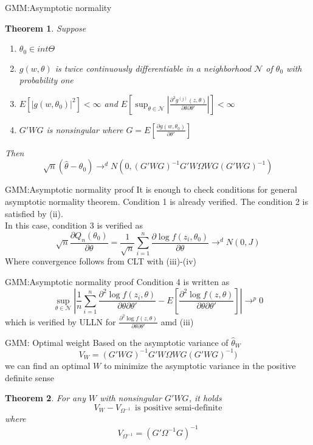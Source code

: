 \documentclass{beamer}
\newtheorem{thm}{Theorem}[subsection]
\begin{document}
\begin{frame}{GMM:Asymptotic normality}
	\begin{thm}
		Suppose 
		\begin{enumerate}
				\item $\theta_0 \in int \Theta$
				\item $g(w, \theta)$ is twice continuously differentiable in a neighborhood $\mathcal{N}$ of $\theta_0$ with probability one
				\item $E[|g(w,\theta_0)|^2] < \infty$ and $E[\sup_{\theta \in \mathcal{N}} | \frac{\partial^2 g^{(j)}(z,\theta)}{\partial \theta \partial \theta'}|] < \infty$
				\item $G'WG$ is nonsingular where $G = E[\frac{\partial g(w,\theta_0)}{\partial \theta'}]$
		\end{enumerate}
		Then
		\[\sqrt{n}(\hat{\theta} - \theta_0) \rightarrow^d N(0,(G'WG)^{-1} G'W\Omega WG(G'WG)^{-1})\]
	\end{thm}
\end{frame}
\begin{frame}{GMM:Asymptotic normality proof}
	It is enough to check conditions for general asymptotic normality theorem. Condition 1 is already verified. The condition 2 is satisfied by (ii).\\
	In this case, condition 3 is verified as 
	\[\sqrt{n} \frac{\partial Q_n(\theta_0)}{\partial \theta} = \frac{1}{\sqrt{n}} \sum^n_{i=1} \frac{\partial \log f(z_i,\theta_0)}{\partial \theta} \rightarrow^d N(0,J)\]
	Where convergence follows from CLT with (iii)-(iv)
\end{frame}
\begin{frame}{GMM:Asymptotic normality proof}
	Condition 4 is written as 
	\[\sup_{\theta \in \mathcal{N}} | \frac{1}{n} \sum^n_{i=1} \frac{\partial^2 \log f(z_i,\theta)}{\partial \theta \partial \theta'} - E[\frac{\partial^2 \log f(z,\theta)}{\partial \theta \partial \theta'}]| \rightarrow^p 0\]
	which is verified by ULLN for $\frac{\partial^2 \log f(z,\theta)}{\partial \theta \partial \theta'}$ amd (iii)
\end{frame}
\begin{frame}{GMM: Optimal weight}
	Based on the asymptotic variance of $\hat{\theta}_W$
\[V_W = (G'WG)^{-1} G'W\Omega WG(G'WG)^{-1})\]
we can find an optimal $W$ to minimize the asymptotic variance in the positive definite sense
\begin{thm}
	For any $W$ with nonsingular $G'WG$, it holds 
	\[V_W - V_{\Omega^{-1}} \ \ \text{is positive semi-definite}\]
	where
	\[V_{\Omega^{-1}} = (G'\Omega^{-1}G)^{-1}\]
\end{thm}
\end{frame}
\end{document}
